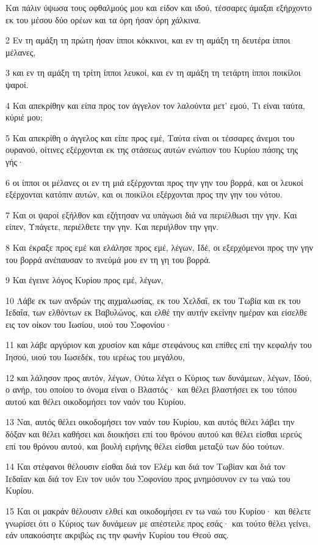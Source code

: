 \par Και πάλιν ύψωσα τους οφθαλμούς μου και είδον και ιδού, τέσσαρες άμαξαι εξήρχοντο εκ του μέσου δύο ορέων και τα όρη ήσαν όρη χάλκινα.
\par 2 Εν τη αμάξη τη πρώτη ήσαν ίπποι κόκκινοι, και εν τη αμάξη τη δευτέρα ίπποι μέλανες,
\par 3 και εν τη αμάξη τη τρίτη ίπποι λευκοί, και εν τη αμάξη τη τετάρτη ίπποι ποικίλοι ψαροί.
\par 4 Και απεκρίθην και είπα προς τον άγγελον τον λαλούντα μετ' εμού, Τι είναι ταύτα, κύριέ μου;
\par 5 Και απεκρίθη ο άγγελος και είπε προς εμέ, Ταύτα είναι οι τέσσαρες άνεμοι του ουρανού, οίτινες εξέρχονται εκ της στάσεως αυτών ενώπιον του Κυρίου πάσης της γής·
\par 6 οι ίπποι οι μέλανες οι εν τη μιά εξέρχονται προς την γην του βορρά, και οι λευκοί εξέρχονται κατόπιν αυτών, και οι ποικίλοι εξέρχονται προς την γην του νότου.
\par 7 Και οι ψαροί εξήλθον και εζήτησαν να υπάγωσι διά να περιέλθωσι την γην. Και είπεν, Υπάγετε, περιέλθετε την γην. Και περιήλθον την γην.
\par 8 Και έκραξε προς εμέ και ελάλησε προς εμέ, λέγων, Ιδέ, οι εξερχόμενοι προς την γην του βορρά ανέπαυσαν το πνεύμά μου εν τη γη του βορρά.
\par 9 Και έγεινε λόγος Κυρίου προς εμέ, λέγων,
\par 10 Λάβε εκ των ανδρών της αιχμαλωσίας, εκ του Χελδαΐ, εκ του Τωβία και εκ του Ιεδαΐα, των ελθόντων εκ Βαβυλώνος, και ελθέ την αυτήν εκείνην ημέραν και είσελθε εις τον οίκον του Ιωσίου, υιού του Σοφονίου·
\par 11 και λάβε αργύριον και χρυσίον και κάμε στεφάνους και επίθες επί την κεφαλήν του Ιησού, υιού του Ιωσεδέκ, του ιερέως του μεγάλου,
\par 12 και λάλησον προς αυτόν, λέγων, Ούτω λέγει ο Κύριος των δυνάμεων, λέγων, Ιδού, ο ανήρ, του οποίου το όνομα είναι ο Βλαστός· και θέλει βλαστήσει εκ του τόπου αυτού και θέλει οικοδομήσει τον ναόν του Κυρίου.
\par 13 Ναι, αυτός θέλει οικοδομήσει τον ναόν του Κυρίου, και αυτός θέλει λάβει την δόξαν και θέλει καθήσει και διοικήσει επί του θρόνου αυτού και θέλει είσθαι ιερεύς επί του θρόνου αυτού, και βουλή ειρήνης θέλει είσθαι μεταξύ των δύο τούτων.
\par 14 Και στέφανοι θέλουσιν είσθαι διά τον Ελέμ και διά τον Τωβίαν και διά τον Ιεδαΐαν και διά τον Ειν τον υιόν του Σοφονίου προς μνημόσυνον εν τω ναώ του Κυρίου.
\par 15 Και οι μακράν θέλουσιν ελθεί και οικοδομήσει εν τω ναώ του Κυρίου· και θέλετε γνωρίσει ότι ο Κύριος των δυνάμεων με απέστειλε προς εσάς· και τούτο θέλει γείνει, εάν υπακούσητε ακριβώς εις την φωνήν Κυρίου του Θεού σας.

